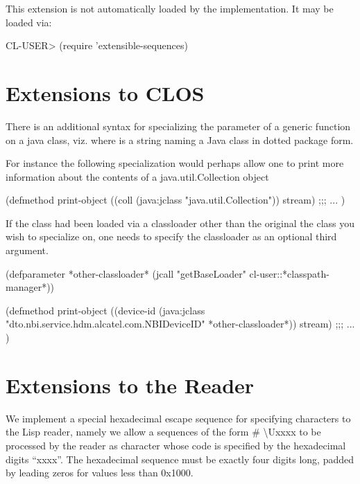 \documentclass[10pt]{book}
\begin{document}
This extension is not automatically loaded by the implementation.   It
may be loaded via:

\begin{listing-lisp}
CL-USER> (require 'extensible-sequences)
\end{listing-lisp}

\section{Extensions to CLOS}

There is an additional syntax for specializing the parameter of a
generic function on a java class, viz. 
where  is a string naming a Java class in dotted package
form.

For instance the following specialization would perhaps allow one to
print more information about the contents of a java.util.Collection
object

\begin{listing-lisp}
(defmethod print-object ((coll (java:jclass "java.util.Collection"))
                         stream)
  ;;; ...
)
\end{listing-lisp}

If the class had been loaded via a classloader other than the original
the class you wish to specialize on, one needs to specify the
classloader as an optional third argument.

\begin{listing-lisp}

(defparameter *other-classloader*
  (jcall "getBaseLoader" cl-user::*classpath-manager*))
  
(defmethod print-object ((device-id (java:jclass "dto.nbi.service.hdm.alcatel.com.NBIDeviceID" *other-classloader*))
                         stream)
  ;;; ...
)
\end{listing-lisp}

\section{Extensions to the Reader}

We implement a special hexadecimal escape sequence for specifying
characters to the Lisp reader, namely we allow a sequences of the form
\# \textbackslash Uxxxx to be processed by the reader as character whose code is
specified by the hexadecimal digits ``xxxx''.  The hexadecimal sequence
must be exactly four digits long, padded by leading zeros for values
less than 0x1000.
\end{document}
